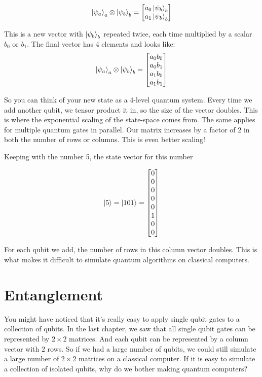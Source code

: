$$
 \ket{\psi_a}_a \otimes \ket{\psi_b}_b = \begin{bmatrix} a_0\ket{\psi_b}_b \\ a_1\ket{\psi_b}_b \end{bmatrix}
$$

This is a new vector with $\ket{\psi_b}_b$ repeated twice, each time multiplied by a scalar $b_0$ or $b_1$. The final vector has 4 elements and looks like: 
$$
 \ket{\psi_a}_a \otimes \ket{\psi_b}_b = \begin{bmatrix} a_0 b_0 \\ a_0 b_1 \\ a_1b_0 \\ a_1 b_1 \end{bmatrix}
$$

So you can think of your new state as a 4-level quantum system. Every time we add another qubit, we tensor product it in, so the size of the vector doubles. This is where the exponential scaling of the state-space comes from. The same applies for multiple quantum gates in parallel. Our matrix increases by a factor of 2 in both the number of rows or columns. This is even better scaling!

Keeping with the number 5, the state vector for this number 

$$ \ket{5} = \ket{101} = \begin{bmatrix} 0 \\ 0\\ 0\\ 0\\ 0\\ 1\\0\\0 \end{bmatrix} $$

For each qubit we add, the number of rows in this column vector doubles. This is what makes it difficult to simulate quantum algorithms on classical computers. 

\section{ Entanglement } 

You might have noticed that it's really easy to apply single qubit gates to a collection of qubits. In the last chapter, we saw that all single qubit gates can be represented by $ 2 \times 2$ matrices. And each qubit can be represented by a column vector with 2 rows. So if we had a large number of qubits, we could still simulate a large number of $2 \times 2$ matrices on a classical computer. If it is easy to simulate a collection of isolated qubits, why do we bother making quantum computers? 

